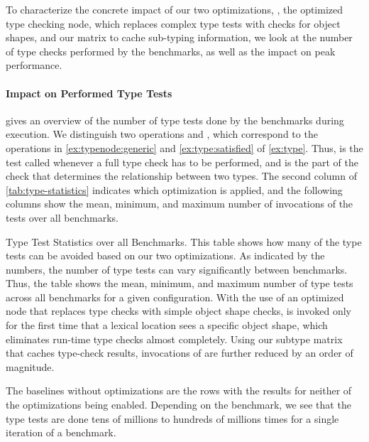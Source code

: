 To characterize the concrete impact of our two optimizations, \ie,
the optimized type checking node, which replaces complex type tests
with checks for object shapes, and our matrix to cache sub-typing information,
we look at the number of type checks performed by the benchmarks,
as well as the impact on peak performance.

\paragraph*{Impact on Performed Type Tests}

 gives an overview of the number of type tests done
by the benchmarks during execution.
We distinguish two operations  and ,
which correspond to the operations in
 \cref{ex:typenode:generic} and \cref{ex:type:satisfied} of \cref{ex:type}.
Thus,  is the test called
whenever a full type check has to be performed,
and  is the part of the check that
determines the relationship between two types.
The second column of \cref{tab:type-statistics} indicates
which optimization is applied,
and the following columns show the mean,
minimum, and maximum number of invocations of the tests
over all benchmarks.

\begin{table}[htb]
  \caption{Type Test Statistics over all Benchmarks.
  This table shows how many of the type tests can be avoided based on our two optimizations.
  As indicated by the numbers, the number of type tests can vary significantly
  between benchmarks.
  Thus, the table shows the mean, minimum, and maximum number of type tests
  across all benchmarks for a given configuration.
  With the use of an optimized node that replaces type checks with simple object shape checks,
   is invoked only for the first time that a lexical location
  sees a specific object shape, which eliminates run-time type checks almost completely.
  Using our subtype matrix that caches type-check results,
  invocations of  are further reduced by an order of magnitude.}
  \label{tab:type-statistics}

  \begin{center}
    \TypingStatsTable{}
  \end{center}
\end{table}

The baselines without optimizations are the rows with the results
for neither of the optimizations being enabled.
Depending on the benchmark,
we see that the type tests
are done tens of millions
to hundreds of millions times
for a single iteration of a benchmark.

